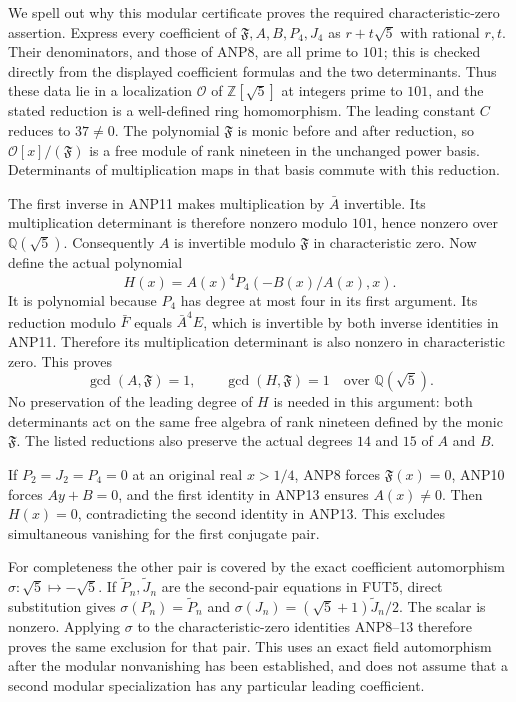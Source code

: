 We spell out why this modular certificate proves the required
characteristic-zero assertion. Express every coefficient of
$\mathfrak F,A,B,P_4,J_4$ as $r+t\sqrt5$ with rational $r,t$.
Their denominators, and those of ANP8, are all prime to $101$;
this is checked directly from the displayed coefficient formulas
and the two determinants. Thus these data lie in a localization
$\mathcal O$ of $\mathbb Z[\sqrt5]$ at integers prime to $101$,
and the stated reduction is a well-defined ring homomorphism.
The leading constant $C$ reduces to $37\ne0$.
The polynomial $\mathfrak F$ is monic before and after reduction,
so $\mathcal O[x]/(\mathfrak F)$ is a free module of rank nineteen
in the unchanged power basis. Determinants of multiplication maps
in that basis commute with this reduction.

The first inverse in ANP11 makes multiplication by $\bar A$
invertible. Its multiplication determinant is therefore nonzero
modulo $101$, hence nonzero over $\mathbb Q(\sqrt5)$.
Consequently $A$ is invertible modulo $\mathfrak F$ in
characteristic zero. Now define the actual polynomial
\[
              H(x)=A(x)^4P_4(-B(x)/A(x),x).
 \tag{ANP12}
\]
It is polynomial because $P_4$ has degree at most four in its first
argument. Its reduction modulo $\bar F$ equals $\bar A^4 E$,
which is invertible by both inverse identities in ANP11.
Therefore its multiplication determinant is also nonzero in
characteristic zero. This proves
\[
          \gcd(A,\mathfrak F)=1,\qquad
          \gcd(H,\mathfrak F)=1
              \quad\text{over }\mathbb Q(\sqrt5).
 \tag{ANP13}
\]
No preservation of the leading degree of $H$ is needed in this
argument: both determinants act on the same free algebra of rank
nineteen defined by the monic $\mathfrak F$. The listed reductions
also preserve the actual degrees $14$ and $15$ of $A$ and $B$.

If $P_2=J_2=P_4=0$ at an original real $x>1/4$, ANP8 forces
$\mathfrak F(x)=0$, ANP10 forces $Ay+B=0$, and the first identity
in ANP13 ensures $A(x)\ne0$. Then $H(x)=0$, contradicting the
second identity in ANP13. This excludes simultaneous vanishing for
the first conjugate pair.

For completeness the other pair is covered by the exact coefficient
automorphism $\sigma:\sqrt5\mapsto-\sqrt5$.
If $\widetilde P_n,\widetilde J_n$ are the second-pair equations
in FUT5, direct substitution gives
$\sigma(P_n)=\widetilde P_n$ and
$\sigma(J_n)=(\sqrt5+1)\widetilde J_n/2$.
The scalar is nonzero. Applying $\sigma$ to the characteristic-zero
identities ANP8--13 therefore proves the same exclusion for that pair.
This uses an exact field automorphism after the modular nonvanishing
has been established, and does not assume that a second modular
specialization has any particular leading coefficient.

